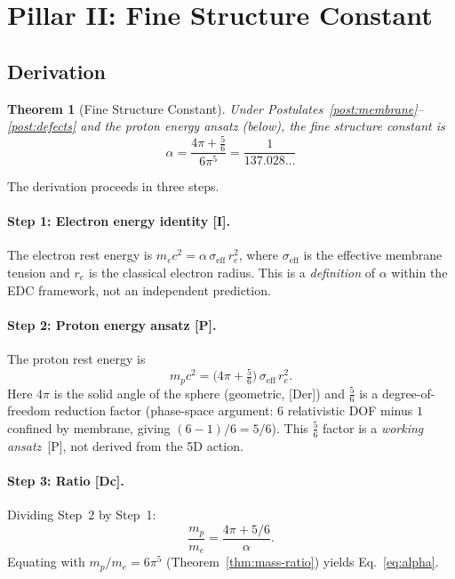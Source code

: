 \documentclass[12pt,a4paper]{article}
\newtheorem{theorem}{Theorem}
\theoremstyle{definition}
\theoremstyle{remark}
\newcommand{\tagDer}{\textsf{[Der]}}
\newcommand{\tagDc}{\textsf{[Dc]}}
\newcommand{\tagP}{\textsf{[P]}}
\newcommand{\tagI}{\textsf{[I]}}
\begin{document}
\section{Pillar II: Fine Structure Constant}
\label{sec:alpha}

\subsection{Derivation}

\begin{theorem}[Fine Structure Constant]
\label{thm:alpha}
Under Postulates~\ref{post:membrane}--\ref{post:defects} and the
proton energy ansatz (below), the fine structure constant is
\begin{equation}
  \alpha = \frac{4\pi + \tfrac{5}{6}}{6\pi^5}
         = \frac{1}{137.028\ldots}
  \label{eq:alpha}
\end{equation}
\end{theorem}

The derivation proceeds in three steps.

\paragraph{Step 1: Electron energy identity \tagI.}
The electron rest energy is
$m_e c^2 = \alpha\,\sigma_{\mathrm{eff}}\,r_e^2$,
where $\sigma_{\mathrm{eff}}$ is the effective membrane tension and
$r_e$ is the classical electron radius.  This is a \emph{definition}
of $\alpha$ within the EDC framework, not an independent prediction.

\paragraph{Step 2: Proton energy ansatz \tagP.}
The proton rest energy is
\begin{equation}
  m_p c^2 = \bigl(4\pi + \tfrac{5}{6}\bigr)\,\sigma_{\mathrm{eff}}\,r_e^2.
  \label{eq:proton-energy}
\end{equation}
Here $4\pi$ is the solid angle of the sphere (geometric,
\tagDer) and $\tfrac{5}{6}$ is a degree-of-freedom
reduction factor (phase-space argument: $6$ relativistic DOF minus
$1$ confined by membrane, giving $(6-1)/6 = 5/6$).  This
$\tfrac{5}{6}$ factor is a \emph{working ansatz}~\tagP, not derived
from the 5D action.

\paragraph{Step 3: Ratio \tagDc.}
Dividing Step~2 by Step~1:
\[
  \frac{m_p}{m_e} = \frac{4\pi + 5/6}{\alpha}.
\]
Equating with $m_p/m_e = 6\pi^5$ (Theorem~\ref{thm:mass-ratio})
yields Eq.~\eqref{eq:alpha}.
\end{document}
